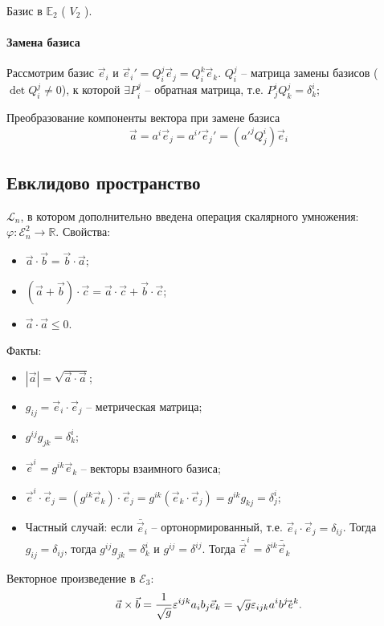 \begin{ex}
  Базис в $\mathbb E_2$ ( $V_2$ ). 
\end{ex}

\paragraph{Замена базиса}

Рассмотрим базис $\vec{e}_i$ и $\vec{e}_i' = Q_i^j \vec{e}_j = Q^k_i \vec{e}_k$. $Q^j_i$ -- матрица 
замены базисов ($\det Q^j_i \neq 0$), к которой $\exists P^j_i$ -- обратная матрица, т.е. $P^i_j Q^j_k = \delta^i_k$; 

Преобразование компоненты вектора при замене базиса
\[
  \vec{a} = a^i \vec{e}_j = a^i' \vec{e}_j' = (a'^j Q^i_j) \vec{e}_i
\]

\subsection{Евклидово пространство}

\begin{definition}
  $\mathcal{L}_n$, в котором дополнительно введена операция скалярного умножения: $\varphi: \mathcal{E}_n^2 \to \mathbb{R}$. 
  Свойства:
  \begin{itemize}
    \item $\vec{a} \cdot \vec{b} = \vec{b} \cdot \vec{a}$;
    \item $(\vec{a}+\vec{b}) \cdot \vec{c} = \vec{a} \cdot \vec{c} + \vec{b} \cdot \vec{c}$;
    \item $\vec{a} \cdot \vec{a} \leqslant 0$.
  \end{itemize}
  
  Факты:
  \begin{itemize}
    \item $|\vec{a}| = \sqrt{ \vec{a} \cdot \vec{a}}$;
    \item $g_{ij} = \vec{e}_i \cdot \vec{e}_j$ -- метрическая матрица;
    \item $g^{ij} g_{jk} = \delta^i_k$;
    \item $\vec{e}^i = g^{ik} \vec{e}_k$ -- векторы взаимного базиса;
    \item $\vec{e}^i \cdot \vec{e}_j = (g^{ik} \vec{e}_k) \cdot \vec{e}_j = g^{ik} (\vec{e}_k \cdot \vec{e}_j) = g^{ik} g_{kj} = \delta^i_j$;
    \item Частный случай: если $\bar{\vec{e}}_i$ -- ортонормированный, т.е.
      $\vec{e}_i \cdot \vec{e}_j = \delta_{ij}$. Тогда $g_{ij} = \delta_{ij}$, тогда
      $g^{ij} g_{jk} = \delta^i_k$ и $g^{ij} = \delta^{ij}$. Тогда $\bar{\vec{e}}^i = \delta^{ik} \bar{\vec{e}}_k$
  \end{itemize}
\end{definition}

Векторное произведение в $\mathcal{E}_3$:
\[
  \vec{a} \times \vec{b} = \dfrac{1}{\sqrt{g}} \varepsilon^{ijk} a_i b_j \vec{e}_k
  = \sqrt{g} \varepsilon_{ijk} a^i b^j \skew{-7}\vec{e}^k.
\]
